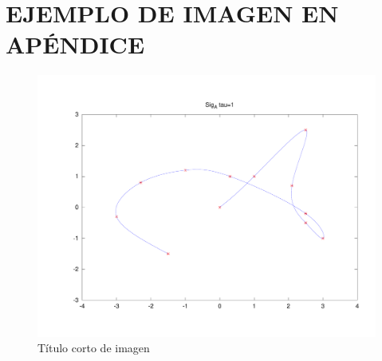 \chapter{EJEMPLO DE IMAGEN EN APÉNDICE}\label{apx:img}
\begin{figure}[ht]
\includegraphics[scale=0.48,angle=0]{images/ejemplo}
\caption[Título corto de imagen]{Título corto de imagen}\label{img:imgscl}
\end{figure}


